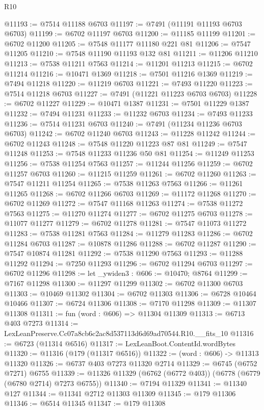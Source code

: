 \begin{lexlean}{R10}
\begin{coremodule}
@11193 := @7514 @11188 @6703
@11197 := @7491 (@11191 @11193 @6703 @6703)
@11199 := @6702 @11197 @6703
@11200 := @11185 @11199
@11201 := @6702 @11200
@11205 := @7548 @11177 @11180 @221 @81
@11206 := @7547 @11205
@11210 := @7548 @11190 @11193 @132 @81
@11211 := @11206 @11210
@11213 := @7538 @11211 @7563
@11214 := @11201 @11213
@11215 := @6702 @11214
@11216 := @10471 @1369
@11218 := @7501 @11216 @1369
@11219 := @7494 @11218
@11220 := @11219 @6703
@11221 := @7493 @11220
@11223 := @7514 @11218 @6703
@11227 := @7491 (@11221 @11223 @6703 @6703)
@11228 := @6702 @11227
@11229 := @10471 @1387
@11231 := @7501 @11229 @1387
@11232 := @7494 @11231
@11233 := @11232 @6703
@11234 := @7493 @11233
@11236 := @7514 @11231 @6703
@11240 := @7491 (@11234 @11236 @6703 @6703)
@11242 := @6702 @11240 @6703
@11243 := @11228 @11242
@11244 := @6702 @11243
@11248 := @7548 @11220 @11223 @87 @81
@11249 := @7547 @11248
@11253 := @7548 @11233 @11236 @50 @81
@11254 := @11249 @11253
@11256 := @7538 @11254 @7563
@11257 := @11244 @11256
@11259 := @6702 @11257 @6703
@11260 := @11215 @11259
@11261 := @6702 @11260
@11263 := @7547 @11211 @11254
@11265 := @7538 @11263 @7563
@11266 := @11261 @11265
@11268 := @6702 @11266 @6703
@11269 := @11172 @11268
@11270 := @6702 @11269
@11272 := @7547 @11168 @11263
@11274 := @7538 @11272 @7563
@11275 := @11270 @11274
@11277 := @6702 @11275 @6703
@11278 := @11077 @11277
@11279 := @6702 @11278
@11281 := @7547 @11073 @11272
@11283 := @7538 @11281 @7563
@11284 := @11279 @11283
@11286 := @6702 @11284 @6703
@11287 := @10878 @11286
@11288 := @6702 @11287
@11290 := @7547 @10874 @11281
@11292 := @7538 @11290 @7563
@11293 := @11288 @11292
@11294 := @7250 @11293
@11296 := @6702 @11294 @6703
@11297 := @6702 @11296
@11298 := let _ywiden3 : @606 := @10470; @8764
@11299 := @7167 @11298
@11300 := @11297 @11299
@11302 := @6702 @11300 @6703
@11303 := @10469 @11302
@11304 := @6702 @11303
@11306 := @6728 @10464 @10466
@11307 := @6724 @11306
@11308 := @7170 @11298
@11309 := @11307 @11308
@11311 := fun (word : @606) => @11304 @11309
@11313 := @6713 @403 @7273
@11314 := LexLeanPreserve.Cc07a8cb6c2ac8d537113d6d69ad70544.R10.__fits_10
@11316 := @6723 (@11314 @6516)
@11317 := LexLeanBoot.ContentId.wordBytes
@11320 := @11316 (@179 (@11317 @6516))
@11322 := (word : @606) -> @11313 @11320
@11326 := @6737 @403 @7273 @11320 @2714
@11329 := @6745 (@6752 @7271) @6755
@11339 := @11326 @11329 (@6762 (@6772 @403)) (@6778 (@6779 (@6780 @2714) @7273 @6755))
@11340 := @7194 @11329
@11341 := @11340 @127
@11344 := @11341 @2712 @11303 @11309
@11345 := @179 @11306
@11346 := @6514 @11345
@11347 := @179 @11308

\end{coremodule}
\end{lexlean}
